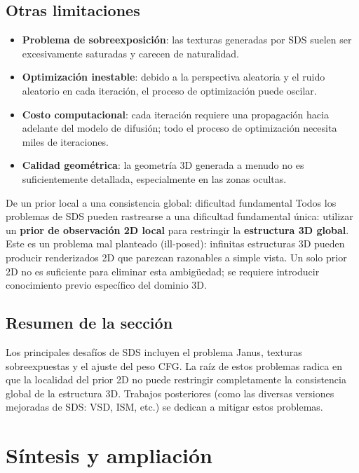 \documentclass[a4paper]{article}
\begin{document}
\subsection{Otras limitaciones}

\begin{itemize}
    \item \textbf{Problema de sobreexposición}: las texturas generadas por SDS suelen ser excesivamente saturadas y carecen de naturalidad.
    \item \textbf{Optimización inestable}: debido a la perspectiva aleatoria y el ruido aleatorio en cada iteración, el proceso de optimización puede oscilar.
    \item \textbf{Costo computacional}: cada iteración requiere una propagación hacia adelante del modelo de difusión; todo el proceso de optimización necesita miles de iteraciones.
    \item \textbf{Calidad geométrica}: la geometría 3D generada a menudo no es suficientemente detallada, especialmente en las zonas ocultas.
\end{itemize}

\begin{warningbox}{De un prior local a una consistencia global: dificultad fundamental}
Todos los problemas de SDS pueden rastrearse a una dificultad fundamental única: utilizar un \textbf{prior de observación 2D local} para restringir la \textbf{estructura 3D global}. Este es un problema mal planteado (ill-posed): infinitas estructuras 3D pueden producir renderizados 2D que parezcan razonables a simple vista. Un solo prior 2D no es suficiente para eliminar esta ambigüedad; se requiere introducir conocimiento previo específico del dominio 3D.
\end{warningbox}

\subsection{Resumen de la sección}

Los principales desafíos de SDS incluyen el problema Janus, texturas sobreexpuestas y el ajuste del peso CFG. La raíz de estos problemas radica en que la localidad del prior 2D no puede restringir completamente la consistencia global de la estructura 3D. Trabajos posteriores (como las diversas versiones mejoradas de SDS: VSD, ISM, etc.) se dedican a mitigar estos problemas.

\newpage

\section{Síntesis y ampliación}
\end{document}
